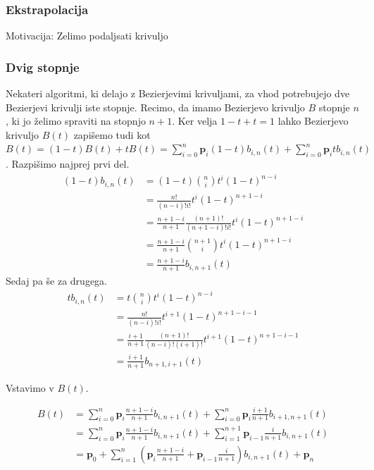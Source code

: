 \documentclass[isrm2, tisk]{fmfdelo}
\newcommand{\lilb}[2]{b_{#1,#2}(t)}
\begin{document}
    \subsubsection{Ekstrapolacija}
    Motivacija: Zelimo podaljsati krivuljo

    \subsubsection{Dvig stopnje}
    Nekateri algoritmi, ki delajo z Bezierjevimi krivuljami, za vhod potrebujejo dve Bezierjevi krivulji iste stopnje.
    Recimo, da imamo Bezierjevo krivuljo $B$ stopnje $n$, ki jo želimo spraviti na stopnjo $n+1$.
    Ker velja $1-t+t=1$ lahko Bezierjevo krivuljo $B(t)$ zapišemo tudi kot $B(t) = (1-t)B(t)+tB(t) = \sum_{i=0}^{n}\mathbf{p}_{i}(1-t)\lilb{i}{n} +\sum_{i=0}^{n}\mathbf{p}_{i}t\lilb{i}{n} $.
    Razpišimo najprej prvi del.
    \begin{align*}
    (1-t)
        \lilb{i}{n} &= (1-t)\binom{n}{i}t^i(1-t)^{n-i} \\
        &= \frac{n!}{(n-i)!i!}t^i(1-t)^{n+1-i} \\
        &=\frac{n+1-i}{n+1}\frac{(n+1)!}{(n+1-i)!i!}t^i(1-t)^{n+1-i}\\
        &=\frac{n+1-i}{n+1} \binom{n+1}{i}t^i(1-t)^{n+1-i} \\
        &=\frac{n+1-i}{n+1}\lilb{i}{n+1}
    \end{align*}
    Sedaj pa še za drugega.
    \begin{align*}
        t\lilb{i}{n} &= t\binom{n}{i}t^i(1-t)^{n-i} \\
        &= \frac{n!}{(n-i)!i!}t^{i+1}(1-t)^{n+1-i-1} \\
        &= \frac{i+1}{n+1}\frac{(n+1)!}{(n-i)!(i+1)!}t^{i+1}(1-t)^{n+1-i-1} \\
        &= \frac{i+1}{n+1}\lilb{n+1}{i+1}
    \end{align*}

    Vstavimo v $B(t)$.

    \begin{align*}
        B(t) &= \sum_{i=0}^{n}\mathbf{p}_{i}\frac{n+1-i}{n+1}\lilb{i}{n+1} +\sum_{i=0}^{n}\mathbf{p}_{i}\frac{i+1}{n+1}\lilb{i+1}{n+1}\\
        &= \sum_{i=0}^{n}\mathbf{p}_{i}\frac{n+1-i}{n+1}\lilb{i}{n+1} +\sum_{i=1}^{n+1}\mathbf{p}_{i-1}\frac{i}{n+1}\lilb{i}{n+1} \\
        &=\mathbf{p}_{0} + \sum_{i=1}^{n}\left(\mathbf{p}_{i}\frac{n+1-i}{n+1} + \mathbf{p}_{i-1}\frac{i}{n+1}\right)\lilb{i}{n+1}+\mathbf{p}_{n}
    \end{align*}
\end{document}
